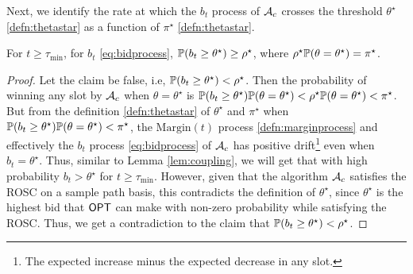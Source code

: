  Next, we identify the rate at which the $b_t$ process of $\mathcal{A}_c$ crosses the threshold $\theta^\star$ \eqref{defn:thetastar} as a function of $\pi^\star$ \eqref{defn:thetastar}.
  \begin{lemma}\label{lem:hittingthetastar}
For $t\ge \tau_{\min} $, %
for $b_t$ \eqref{eq:bidprocess}, ${\mathbb{P}}(b_t\ge \theta^\star) \ge \rho^\star$, where $\rho^\star {\mathbb{P}}(\theta=\theta^\star) = \pi^\star$.
\end{lemma}
\begin{proof}
Let the claim be false, i.e, ${\mathbb{P}}(b_t\ge \theta^\star)< \rho^\star$. Then the probability of winning any slot by $\mathcal{A}_c$ when $\theta=\theta^\star$ is   ${\mathbb{P}}(b_t\ge \theta^\star){\mathbb{P}}(\theta=\theta^\star)< \rho^\star {\mathbb{P}}(\theta=\theta^\star) < \pi^\star$. 
But from the definition \eqref{defn:thetastar} of $\theta^\star$ and $\pi^\star$ when ${\mathbb{P}}(b_t\ge \theta^\star){\mathbb{P}}(\theta=\theta^\star)< \pi^\star$, the $\text{Margin}(t)$ process \eqref{defn:marginprocess} and effectively the $b_t$ process \eqref{eq:bidprocess} of $\mathcal{A}_c$ has positive drift\footnote{The expected  increase minus the expected decrease in any slot.}
 even when $b_t=\theta^\star$. Thus, similar to Lemma \ref{lem:coupling}, we will get that with high probability $b_t > \theta^\star$ for $t\ge \tau_{\min}$.  However, given that the algorithm $\mathcal{A}_c$ satisfies the ROSC on a sample path basis,  this contradicts the definition of $\theta^\star$, since $\theta^\star$ is the highest bid that $\mathsf{OPT}$ can make with non-zero probability while satisfying the ROSC. 
 Thus, we get a contradiction to the claim that ${\mathbb{P}}(b_t\ge \theta^\star)< \rho^\star$.
\end{proof}
 

